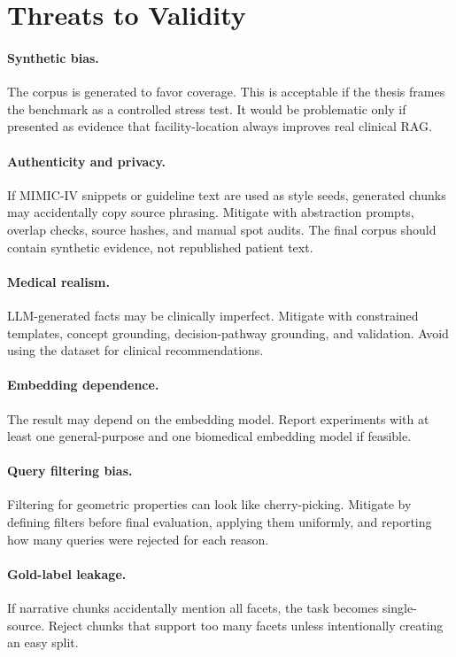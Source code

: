 \documentclass[11pt,a4paper]{article}
\begin{document}
\section{Threats to Validity}

\paragraph{Synthetic bias.}
The corpus is generated to favor coverage. This is acceptable if the thesis frames the benchmark as a controlled stress test. It would be problematic only if presented as evidence that facility-location always improves real clinical RAG.

\paragraph{Authenticity and privacy.}
If MIMIC-IV snippets or guideline text are used as style seeds, generated chunks may accidentally copy source phrasing. Mitigate with abstraction prompts, overlap checks, source hashes, and manual spot audits. The final corpus should contain synthetic evidence, not republished patient text.

\paragraph{Medical realism.}
LLM-generated facts may be clinically imperfect. Mitigate with constrained templates, concept grounding, decision-pathway grounding, and validation. Avoid using the dataset for clinical recommendations.

\paragraph{Embedding dependence.}
The result may depend on the embedding model. Report experiments with at least one general-purpose and one biomedical embedding model if feasible.

\paragraph{Query filtering bias.}
Filtering for geometric properties can look like cherry-picking. Mitigate by defining filters before final evaluation, applying them uniformly, and reporting how many queries were rejected for each reason.

\paragraph{Gold-label leakage.}
If narrative chunks accidentally mention all facets, the task becomes single-source. Reject chunks that support too many facets unless intentionally creating an easy split.
\end{document}
